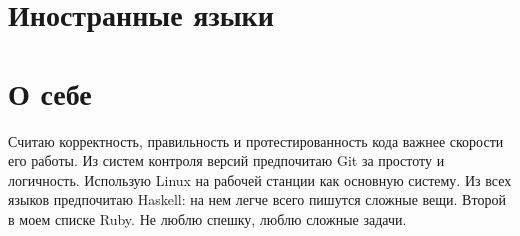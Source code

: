\documentclass[11pt,a4paper,sans]{moderncv}        %
\begin{document}
  

\section{Иностранные языки}

\section{О себе}
Считаю корректность, правильность и протестированность кода важнее скорости его
работы. Из систем контроля версий предпочитаю Git за простоту и
логичность. Использую Linux на рабочей станции как основную систему. Из всех
языков предпочитаю Haskell: на нем легче всего пишутся сложные вещи. Второй в
моем списке Ruby. Не люблю спешку, люблю сложные задачи.

\nocite{*}

\end{document}
